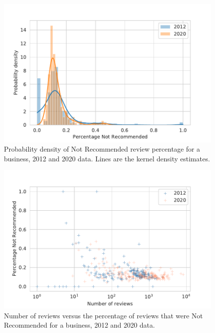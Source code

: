 \begin{figure}[t]
    \centering
    \includegraphics[width=0.9\columnwidth]{figures/filtered_proportion_density.pdf}
    \caption{Probability density of Not Recommended review percentage for a business, 2012 and 2020 data. Lines are the kernel density estimates.}
    \label{fig:filtered_density}
\end{figure}

\begin{figure}[t]
    \centering
    \includegraphics[width=0.9\columnwidth]{figures/filtered_vs_count.pdf}
    \caption{Number of reviews versus the percentage of reviews that were Not Recommended for a business, 2012 and 2020 data.}
    \label{fig:count_vs_perc}
\end{figure}

